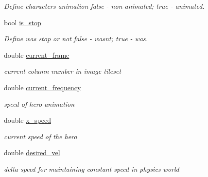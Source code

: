 \begin{DoxyCompactItemize}
\begin{DoxyCompactList}\small\item\em Define characters animation \textquotesingle{}false\textquotesingle{} -\/ non-\/animated; \textquotesingle{}true\textquotesingle{} -\/ animated. \end{DoxyCompactList}\item 
\mbox{\label{class_player_a264c11a27a7fdfe032efb4f15b51c41f}} 
bool \hyperlink{class_player_a264c11a27a7fdfe032efb4f15b51c41f}{is\+\_\+stop}
\begin{DoxyCompactList}\small\item\em Define was stop or not \textquotesingle{}false\textquotesingle{} -\/ wasn\textquotesingle{}t; \textquotesingle{}true\textquotesingle{} -\/ was. \end{DoxyCompactList}\item 
\mbox{\label{class_player_a943966c052b8bfc40439248a2d4e3f8f}} 
double \hyperlink{class_player_a943966c052b8bfc40439248a2d4e3f8f}{current\+\_\+frame}
\begin{DoxyCompactList}\small\item\em current column number in image tileset \end{DoxyCompactList}\item 
\mbox{\label{class_player_ad469c1133f407b68e90d587013b20c71}} 
double \hyperlink{class_player_ad469c1133f407b68e90d587013b20c71}{current\+\_\+frequency}
\begin{DoxyCompactList}\small\item\em speed of hero animation \end{DoxyCompactList}\item 
\mbox{\label{class_player_a8a96a60e7820f887bc0ff8e15aaf5639}} 
double \hyperlink{class_player_a8a96a60e7820f887bc0ff8e15aaf5639}{x\+\_\+speed}
\begin{DoxyCompactList}\small\item\em current speed of the hero \end{DoxyCompactList}\item 
\mbox{\label{class_player_a7798d4f62911339f255225b9f59ae497}} 
double \hyperlink{class_player_a7798d4f62911339f255225b9f59ae497}{desired\+\_\+vel}
\begin{DoxyCompactList}\small\item\em delta-\/speed for maintaining constant speed in physics world \end{DoxyCompactList}\item 

\end{DoxyCompactItemize}
